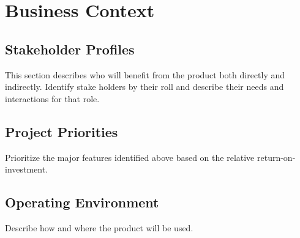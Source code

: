 
\section{Business Context}

\subsection{Stakeholder Profiles}
 This section describes who will benefit from the product both directly and
 indirectly.  Identify stake holders by their roll and describe their needs and
 interactions for that role.

\subsection{Project Priorities}
 Prioritize the major features identified above based on the relative
 return-on-investment.  

\subsection{Operating Environment}
 Describe how and where the product will be used.  
